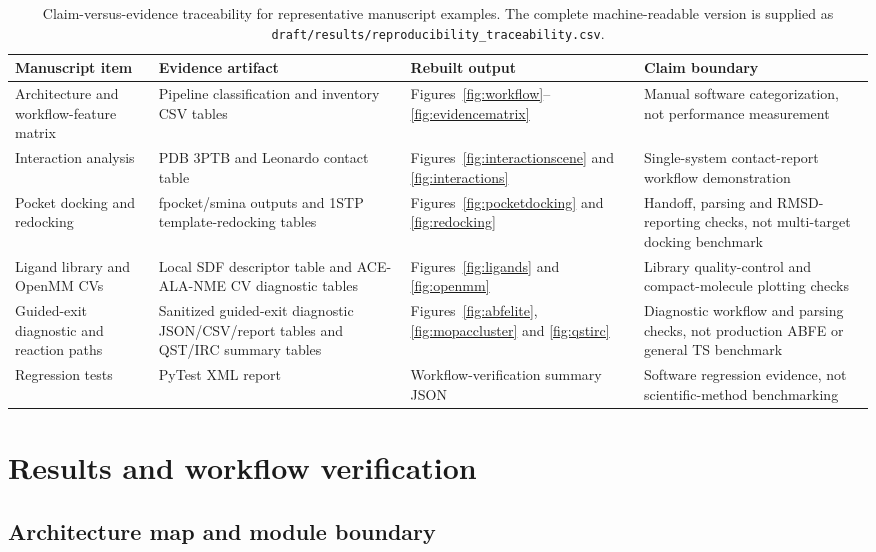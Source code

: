 \documentclass[pdflatex,sn-vancouver-num]{sn-jnl}
\begin{document}
\begin{table}[htbp]
\caption{Claim-versus-evidence traceability for representative manuscript examples.  The complete machine-readable version is supplied as \texttt{draft/results/reproducibility\_traceability.csv}.}\label{tab:traceability}
\small
\begin{tabularx}{\textwidth}{>{\raggedright\arraybackslash}p{}>{\raggedright\arraybackslash}X>{\raggedright\arraybackslash}X>{\raggedright\arraybackslash}p{}}
\toprule
Manuscript item & Evidence artifact & Rebuilt output & Claim boundary \\
\midrule
Architecture and workflow-feature matrix & Pipeline classification and inventory CSV tables & Figures~\ref{fig:workflow}--\ref{fig:evidencematrix} & Manual software categorization, not performance measurement \\
Interaction analysis & PDB 3PTB and Leonardo contact table & Figures~\ref{fig:interactionscene} and \ref{fig:interactions} & Single-system contact-report workflow demonstration \\
Pocket docking and redocking & fpocket/smina outputs and 1STP template-redocking tables & Figures~\ref{fig:pocketdocking} and \ref{fig:redocking} & Handoff, parsing and RMSD-reporting checks, not multi-target docking benchmark \\
Ligand library and OpenMM CVs & Local SDF descriptor table and ACE-ALA-NME CV diagnostic tables & Figures~\ref{fig:ligands} and \ref{fig:openmm} & Library quality-control and compact-molecule plotting checks \\
Guided-exit diagnostic and reaction paths & Sanitized guided-exit diagnostic JSON/CSV/report tables and QST/IRC summary tables & Figures~\ref{fig:abfelite}, \ref{fig:mopaccluster} and \ref{fig:qstirc} & Diagnostic workflow and parsing checks, not production ABFE or general TS benchmark \\
Regression tests & PyTest XML report & Workflow-verification summary JSON & Software regression evidence, not scientific-method benchmarking \\
\bottomrule
\end{tabularx}
\end{table}

\section{Results and workflow verification}\label{sec:modules}

\subsection{Architecture map and module boundary}
\end{document}
